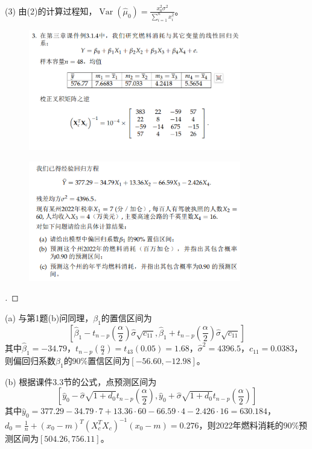 \documentclass[cn,hazy,green,12pt,normal]{elegantnote}
\DeclareMathOperator{\Var}{Var}
\numberwithin{equation}{section}
\numberwithin{subsection}{section}
\begin{document}
(3) 由(2)的计算过程知，$\Var(\hat{\mu}_0)=\frac{x_0^2 \sigma^2}{\sum_{i=1}^n x_i^2}$。

\newpage

\begin{homework}   
\end{homework}
\begin{figure}[!htbp]
    \centering
    \includegraphics[width=25em]{image/hw5_3.png}
\end{figure}
\begin{figure}[!htbp]
    \centering
    \includegraphics[width=25em]{image/hw5_3q.png}
\end{figure}

\begin{proof}[\solutionname]
\end{proof}

(a) 与第1题(b)问同理，$\beta_1$的置信区间为
$$
\left[ \hat{\beta}_1-\mathit{t}_{n-p}(\frac{\alpha}{2})\hat{\sigma} \sqrt{c_{11}} , \hat{\beta}_1+\mathit{t}_{n-p}(\frac{\alpha}{2})\hat{\sigma} \sqrt{c_{11}} \right]
$$
其中$\hat{\beta}_1=-34.79$，$\mathit{t}_{n-p}(\frac{\alpha}{2})=\mathit{t}_{43}(0.05)=1.68$，$\hat{\sigma}^2=4396.5$，$c_{11}=0.0383$，则偏回归系数$\beta_1$的90\%置信区间为$\left[ -56.60,-12.98 \right]$。

(b) 根据课件3.3节的公式，点预测区间为
$$
\left[ \hat{y}_0-\hat{\sigma}\sqrt{1+d_0}\mathit{t}_{n-p}(\frac{\alpha}{2}),\hat{y}_0+\hat{\sigma}\sqrt{1+d_0}\mathit{t}_{n-p}(\frac{\alpha}{2}) \right]
$$
其中$\hat{y}_0=377.29-34.79\cdot7+13.36\cdot60-66.59\cdot4-2.426\cdot16=630.184$，$d_0 = \frac{1}{n} + (x_0-m)^T (X_c^TX_c)^{-1} (x_0-m)=0.276$，则2022年燃料消耗的90\%预测区间为$\left[ 504.26,756.11 \right]$。
\end{document}
